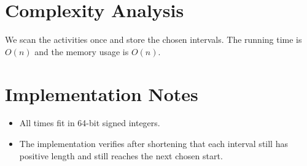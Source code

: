 \documentclass[11pt]{article}
\begin{document}
\section*{Complexity Analysis}

We scan the activities once and store the chosen intervals. The running time is $O(n)$ and the memory
usage is $O(n)$.

\section*{Implementation Notes}

\begin{itemize}[leftmargin=*]
    \item All times fit in 64-bit signed integers.
    \item The implementation verifies after shortening that each interval still has positive length and still
    reaches the next chosen start.
\end{itemize}
\end{document}
